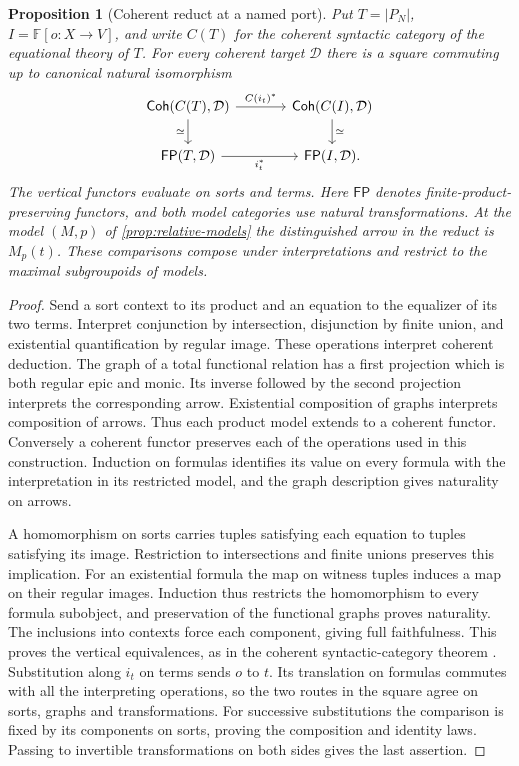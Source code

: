 \documentclass[11pt,a4paper]{article}
\newtheorem{proposition}[proposition]{Proposition}
\theoremstyle{definition}
\theoremstyle{remark}\newaliascnt{remark}{theorem}
\numberwithin{equation}{section}
\begin{document}
\begin{proposition}[Coherent reduct at a named port]\label{prop:coherent-port}
Put \(T=|P_N|\), \(I=\mathbb F[o:X\to V]\), and write \(C(T)\) for the coherent syntactic category of the equational theory of \(T\). For every coherent target \(\mathcal D\) there is a square commuting up to canonical natural isomorphism
\[
\begin{tikzcd}[column sep=large]
 \mathsf{Coh}(C(T),\mathcal D)\arrow[r,"C(i_t)^*"]\arrow[d,"\simeq"']&
 \mathsf{Coh}(C(I),\mathcal D)\arrow[d,"\simeq"]\\
 \mathsf{FP}(T,\mathcal D)\arrow[r,"i_t^*"']&
 \mathsf{FP}(I,\mathcal D).
\end{tikzcd}
\]
The vertical functors evaluate on sorts and terms. Here \(\mathsf{FP}\) denotes finite-product-preserving functors, and both model categories use natural transformations. At the model \((M,p)\) of \cref{prop:relative-models} the distinguished arrow in the reduct is \(M_p(t)\). These comparisons compose under interpretations and restrict to the maximal subgroupoids of models.
\end{proposition}
\begin{proof}
Send a sort context to its product and an equation to the equalizer of its two terms. Interpret conjunction by intersection, disjunction by finite union, and existential quantification by regular image. These operations interpret coherent deduction. The graph of a total functional relation has a first projection which is both regular epic and monic. Its inverse followed by the second projection interprets the corresponding arrow. Existential composition of graphs interprets composition of arrows. Thus each product model extends to a coherent functor. Conversely a coherent functor preserves each of the operations used in this construction. Induction on formulas identifies its value on every formula with the interpretation in its restricted model, and the graph description gives naturality on arrows.

A homomorphism on sorts carries tuples satisfying each equation to tuples satisfying its image. Restriction to intersections and finite unions preserves this implication. For an existential formula the map on witness tuples induces a map on their regular images. Induction thus restricts the homomorphism to every formula subobject, and preservation of the functional graphs proves naturality. The inclusions into contexts force each component, giving full faithfulness. This proves the vertical equivalences, as in the coherent syntactic-category theorem \cite[Theorem 8.1.3]{makkai-reyes}. Substitution along \(i_t\) on terms sends \(o\) to \(t\). Its translation on formulas commutes with all the interpreting operations, so the two routes in the square agree on sorts, graphs and transformations. For successive substitutions the comparison is fixed by its components on sorts, proving the composition and identity laws. Passing to invertible transformations on both sides gives the last assertion.
\end{proof}
\end{document}
